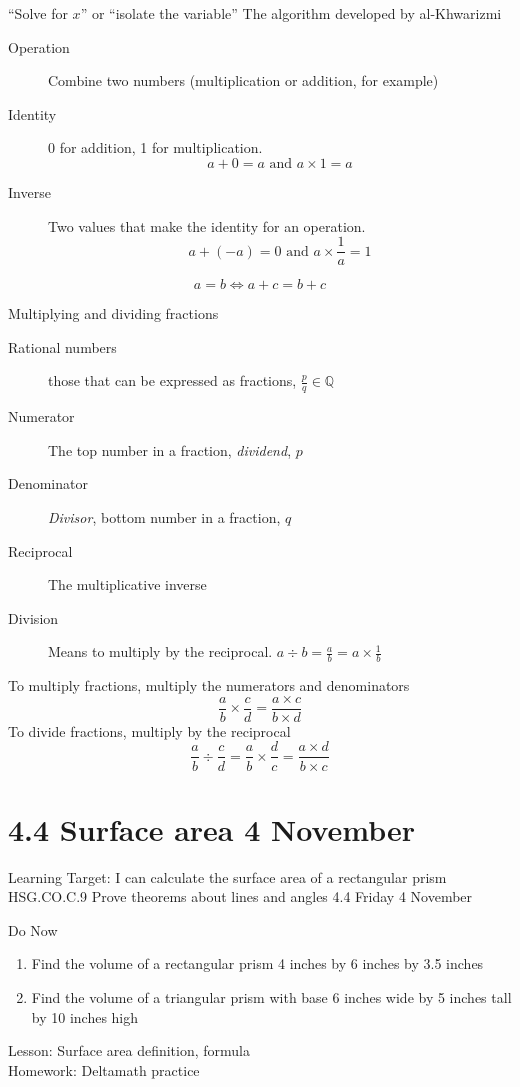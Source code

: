 \begin{frame}{``Solve for $x$'' or ``isolate the variable''}
  {The algorithm developed by al-Khwarizmi}
  \begin{description}
    \item[Operation] Combine two numbers (multiplication or addition, for example)
    \item[Identity] 0 for addition, 1 for multiplication. 
      $$a+0=a \text{ and } a \times 1 = a$$
    \item[Inverse] Two values that make the identity for an operation. 
      $$a + (-a)=0 \text{ and } a \times \frac{1}{a}=1$$
  \end{description}
  $$a = b \Longleftrightarrow a+c = b+c$$
\end{frame}

\begin{frame}{Multiplying and dividing fractions}
  \begin{description}
    \item[Rational numbers] those that can be expressed as fractions, $\displaystyle \frac{p}{q} \in \mathbb{Q}$
    \item[Numerator] The top number in a fraction, \emph{dividend}, $p$
    \item[Denominator] \emph{Divisor}, bottom number in a fraction, $q$
    \item[Reciprocal] The multiplicative inverse
    \item[Division] Means to multiply by the reciprocal. $a \div b = \frac{a}{b} = a \times \frac{1}{b}$
  \end{description}
  To multiply fractions, multiply the numerators and denominators
  $$\frac{a}{b} \times \frac{c}{d} =\frac{a \times c}{b\times d}  $$
  To divide fractions, multiply by the reciprocal
  $$\frac{a}{b} \div \frac{c}{d} = \frac{a}{b} \times \frac{d}{c} = \frac{a \times d}{b\times c}  $$
  \end{frame}

\section{4.4 Surface area \hfill 4 November \,}
  \begin{frame}{Learning Target: I can calculate the surface area of a rectangular prism}
    {HSG.CO.C.9 Prove theorems about lines and angles  \hfill \alert{4.4 Friday 4 November}}
    \begin{block}{Do Now}
      \begin{enumerate}
        \item Find the volume of a rectangular prism 4 inches by 6 inches by 3.5 inches
        \item Find the volume of a triangular prism with base 6 inches wide by 5 inches tall by 10 inches high
      \end{enumerate}
    \end{block}
      Lesson: Surface area definition, formula \\
      Homework: Deltamath practice
  \end{frame}

